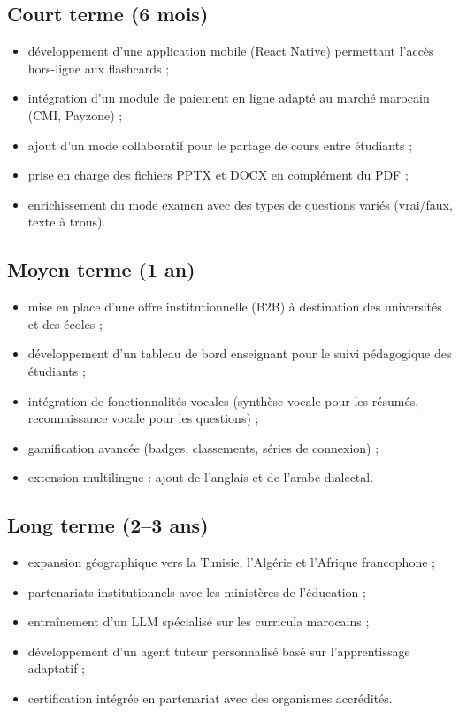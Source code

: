 \subsection{Court terme (6 mois)}

\begin{itemize}
  \item développement d'une application mobile (React Native) permettant l'accès hors-ligne aux flashcards ;
  \item intégration d'un module de paiement en ligne adapté au marché marocain (CMI, Payzone) ;
  \item ajout d'un mode collaboratif pour le partage de cours entre étudiants ;
  \item prise en charge des fichiers PPTX et DOCX en complément du PDF ;
  \item enrichissement du mode examen avec des types de questions variés (vrai/faux, texte à trous).
\end{itemize}

\subsection{Moyen terme (1 an)}

\begin{itemize}
  \item mise en place d'une offre institutionnelle (B2B) à destination des universités et des écoles ;
  \item développement d'un tableau de bord enseignant pour le suivi pédagogique des étudiants ;
  \item intégration de fonctionnalités vocales (synthèse vocale pour les résumés, reconnaissance vocale pour les questions) ;
  \item gamification avancée (badges, classements, séries de connexion) ;
  \item extension multilingue : ajout de l'anglais et de l'arabe dialectal.
\end{itemize}

\subsection{Long terme (2--3 ans)}

\begin{itemize}
  \item expansion géographique vers la Tunisie, l'Algérie et l'Afrique francophone ;
  \item partenariats institutionnels avec les ministères de l'éducation ;
  \item entraînement d'un LLM spécialisé sur les curricula marocains ;
  \item développement d'un agent tuteur personnalisé basé sur l'apprentissage adaptatif ;
  \item certification intégrée en partenariat avec des organismes accrédités.
\end{itemize}
